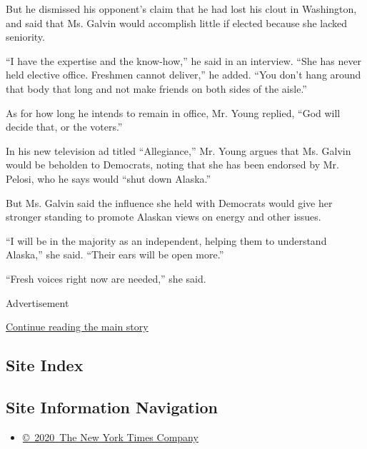 But he dismissed his opponent's claim that he had lost his clout in
Washington, and said that Ms. Galvin would accomplish little if elected
because she lacked seniority.

``I have the expertise and the know-how,'' he said in an interview.
``She has never held elective office. Freshmen cannot deliver,'' he
added. ``You don't hang around that body that long and not make friends
on both sides of the aisle.''

As for how long he intends to remain in office, Mr. Young replied, ``God
will decide that, or the voters.''

In his new television ad titled ``Allegiance,'' Mr. Young argues that
Ms. Galvin would be beholden to Democrats, noting that she has been
endorsed by Mr. Pelosi, who he says would ``shut down Alaska.''

But Ms. Galvin said the influence she held with Democrats would give her
stronger standing to promote Alaskan views on energy and other issues.

``I will be in the majority as an independent, helping them to
understand Alaska,'' she said. ``Their ears will be open more.''

``Fresh voices right now are needed,'' she said.

Advertisement

\protect\hyperlink{after-bottom}{Continue reading the main story}

\hypertarget{site-index}{%
\subsection{Site Index}\label{site-index}}

\hypertarget{site-information-navigation}{%
\subsection{Site Information
Navigation}\label{site-information-navigation}}

\begin{itemize}
\tightlist
\item
  \href{https://help.nytimes3xbfgragh.onion/hc/en-us/articles/115014792127-Copyright-notice}{©~2020~The
  New York Times Company}
\end{itemize}

